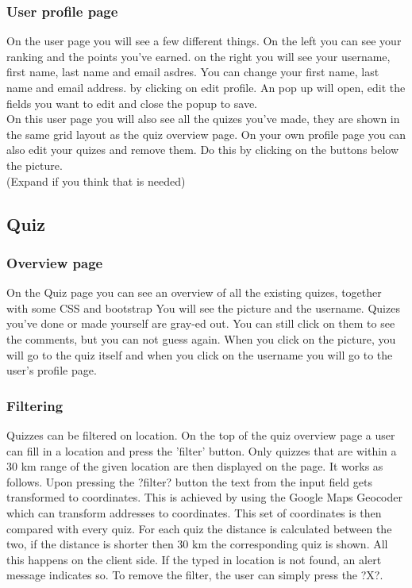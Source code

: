 \documentclass[11pt, oneside]{article}   	%
\begin{document}
\subsubsection{User profile page}
On the user page you will see a few different things. On the left you can see your ranking and the points you've earned. on the right you will see your username, first name, last name and email asdres. You can change your first name, last name and email address. by clicking on edit profile. An pop up will open, edit the fields you want to edit and close the popup to save. \\
On this user page you will also see all the quizes you've made, they are shown in the same grid layout as the quiz overview page. On your own profile page you can also edit your quizes and remove them. Do this by clicking on the buttons below the picture.\\
(Expand if you think that is needed)


\subsection{Quiz}
\subsubsection{ Overview page}
On the Quiz page you can see an overview of all the existing quizes, together with some CSS and bootstrap You will see the picture and the username. Quizes you've done or made yourself are gray-ed out. You can still click on them to see the comments, but you can not guess again. When you click on the picture, you will go to the quiz itself and when you click on the username you will go to the user's profile page. 

\subsubsection{Filtering}
Quizzes can be filtered on location. On the top of the quiz overview page a user can fill in a location and press the 'filter' button. Only quizzes that are within a 30 km range of the given location are then displayed on the page.
It works as follows. Upon pressing the ?filter? button the text from the input field gets transformed to coordinates. This is achieved by using the Google Maps Geocoder which can transform addresses to coordinates. This set of coordinates is then compared with every quiz. For each quiz the distance is calculated between the two, if the distance is shorter then 30 km the corresponding quiz is shown. All this happens on the client side.
If the typed in location is not found, an alert message indicates so. To remove the filter, the user can simply press the ?X?.
\end{document}
